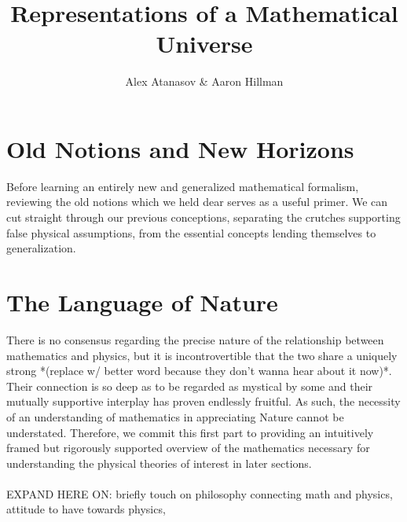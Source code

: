 \documentclass[12pt, twoside, openany]{book}
\title{Representations of a Mathematical Universe}
\author{Alex Atanasov \& Aaron Hillman}
\newcommand{\1}{\mathbbm{1}}
\numberwithin{conceptctr}{section}
\numberwithin{definitionctr}{section}
\begin{document}
\maketitle
\tableofcontents

\cleardoublepage
{}
\part[0]{Old Notions and New Horizons}
Before learning an entirely new and generalized mathematical formalism, reviewing the old notions which we held dear serves as a useful primer.  We can cut straight through our previous conceptions, separating the crutches supporting false physical assumptions, from the essential concepts lending themselves to generalization.  



\cleardoublepage
{}
\part{The Language of Nature}
There is no consensus regarding the precise nature of the relationship between mathematics and physics, but it is incontrovertible that the two share a uniquely strong *(replace w/ better word because they don't wanna hear about it now)*.  Their connection is so deep as to be regarded as mystical by some and their mutually supportive interplay has proven endlessly fruitful.  As such, the necessity of an understanding of mathematics in appreciating Nature cannot be understated.  Therefore, we commit this first part to providing an intuitively framed but rigorously supported overview of the mathematics necessary for understanding the physical theories of interest in later sections.\\\\
EXPAND HERE ON: briefly touch on philosophy connecting math and physics, attitude to have towards physics,     

\printindex
\end{document}
